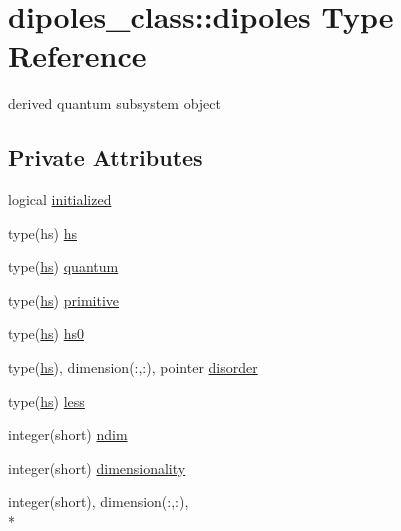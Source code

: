 \hypertarget{structdipoles__class_1_1dipoles}{\section{dipoles\+\_\+class\+:\+:dipoles Type Reference}
\label{structdipoles__class_1_1dipoles}
}


derived quantum subsystem object  


\subsection*{Private Attributes}
\begin{DoxyCompactItemize}
\item 
logical \hyperlink{structdipoles__class_1_1dipoles_a62234fd4a1f98f377becc909912c8785}{initialized}
\item 
type(hs) \hyperlink{structdipoles__class_1_1dipoles_afa2264f1ca48581328e2ab0e1745db4a}{hs}
\item 
type(\hyperlink{structdipoles__class_1_1dipoles_afa2264f1ca48581328e2ab0e1745db4a}{hs}) \hyperlink{structdipoles__class_1_1dipoles_a7b6d2a8feca2c1198896fb10627d029b}{quantum}
\item 
type(\hyperlink{structdipoles__class_1_1dipoles_afa2264f1ca48581328e2ab0e1745db4a}{hs}) \hyperlink{structdipoles__class_1_1dipoles_a56b509ba86b8121570bd7a051cc77fd9}{primitive}
\item 
type(\hyperlink{structdipoles__class_1_1dipoles_afa2264f1ca48581328e2ab0e1745db4a}{hs}) \hyperlink{structdipoles__class_1_1dipoles_a2c208f78e585ed71764e1b37c20be201}{hs0}
\item 
type(\hyperlink{structdipoles__class_1_1dipoles_afa2264f1ca48581328e2ab0e1745db4a}{hs}), dimension(\+:,\+:), pointer \hyperlink{structdipoles__class_1_1dipoles_a8baa5323891d02dede517c209f432c27}{disorder}
\item 
type(\hyperlink{structdipoles__class_1_1dipoles_afa2264f1ca48581328e2ab0e1745db4a}{hs}) \hyperlink{structdipoles__class_1_1dipoles_a0d7a80c3e1a97942236e3e7a1a373cca}{less}
\item 
integer(short) \hyperlink{structdipoles__class_1_1dipoles_a1b540b65199b326d6d477307d646fb1b}{ndim}
\item 
integer(short) \hyperlink{structdipoles__class_1_1dipoles_ae809ff43be02c6f93cd5a6010368a246}{dimensionality}
\item 
integer(short), dimension(\+:,\+:), \\*

\end{DoxyCompactItemize}
